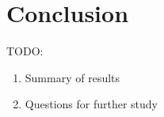 \section{Conclusion}

TODO:

\begin{enumerate}
	\item Summary of results
	\item Questions for further study
\end{enumerate}